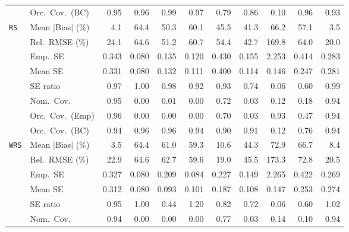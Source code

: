 \begin{landscape}
\begin{longtable}{llrrrrrrrrr}
 & Orc.\ Cov.\ (BC) & \cellcolor{rankone}0.95 & \cellcolor{ranktwo}0.96 & 0.99 & \cellcolor{rankthree}0.97 & 0.79 & 0.86 & 0.10 & \cellcolor{ranktwo}0.96 & \cellcolor{rankthree}0.93 \\
\addlinespace[2pt]
\quad \texttt{RS} & Mean $|$Bias$|$ (\%) & \cellcolor{ranktwo}4.1 & 64.4 & 50.3 & 60.1 & 45.5 & \cellcolor{rankthree}41.3 & 66.2 & 57.1 & \cellcolor{rankone}3.5 \\
 & Rel.\ RMSE (\%) & \cellcolor{ranktwo}24.1 & 64.6 & 51.2 & 60.7 & 54.4 & \cellcolor{rankthree}42.7 & 169.8 & 64.0 & \cellcolor{rankone}20.0 \\
 & Emp.\ SE & 0.343 & 0.080 & 0.135 & 0.120 & 0.430 & 0.155 & 2.253 & 0.414 & 0.283 \\
 & Mean SE & 0.331 & 0.080 & 0.132 & 0.111 & 0.400 & 0.114 & 0.146 & 0.247 & 0.281 \\
 & SE ratio & 0.97 & \cellcolor{rankone}1.00 & \cellcolor{rankthree}0.98 & 0.92 & 0.93 & 0.74 & 0.06 & 0.60 & \cellcolor{ranktwo}0.99 \\
 & Nom.\ Cov. & \cellcolor{rankone}0.95 & 0.00 & 0.01 & 0.00 & \cellcolor{rankthree}0.72 & 0.03 & 0.12 & 0.18 & \cellcolor{ranktwo}0.94 \\
 & Orc.\ Cov.\ (Emp) & \cellcolor{rankone}0.96 & 0.00 & 0.00 & 0.00 & \cellcolor{rankthree}0.70 & 0.03 & \cellcolor{ranktwo}0.93 & 0.47 & \cellcolor{rankone}0.94 \\
 & Orc.\ Cov.\ (BC) & \cellcolor{rankone}0.94 & \cellcolor{rankone}0.96 & \cellcolor{rankone}0.96 & \cellcolor{rankone}0.94 & \cellcolor{rankthree}0.90 & \cellcolor{ranktwo}0.91 & 0.12 & 0.76 & \cellcolor{rankone}0.94 \\
\addlinespace[2pt]
\quad \texttt{WRS} & Mean $|$Bias$|$ (\%) & \cellcolor{rankone}3.5 & 64.4 & 61.0 & 59.3 & \cellcolor{rankthree}10.6 & 44.3 & 72.9 & 66.7 & \cellcolor{ranktwo}8.4 \\
 & Rel.\ RMSE (\%) & \cellcolor{rankthree}22.9 & 64.6 & 62.7 & 59.6 & \cellcolor{rankone}19.0 & 45.5 & 173.3 & 72.8 & \cellcolor{ranktwo}20.5 \\
 & Emp.\ SE & 0.327 & 0.080 & 0.209 & 0.084 & 0.227 & 0.149 & 2.265 & 0.422 & 0.269 \\
 & Mean SE & 0.312 & 0.080 & 0.093 & 0.101 & 0.187 & 0.108 & 0.147 & 0.253 & 0.274 \\
 & SE ratio & \cellcolor{rankthree}0.95 & \cellcolor{rankone}1.00 & 0.44 & 1.20 & 0.82 & 0.72 & 0.06 & 0.60 & \cellcolor{ranktwo}1.02 \\
 & Nom.\ Cov. & \cellcolor{rankone}0.94 & 0.00 & 0.00 & 0.00 & \cellcolor{ranktwo}0.77 & 0.03 & \cellcolor{rankthree}0.14 & 0.10 & \cellcolor{rankone}0.94 \\

\end{longtable}
\end{landscape}
